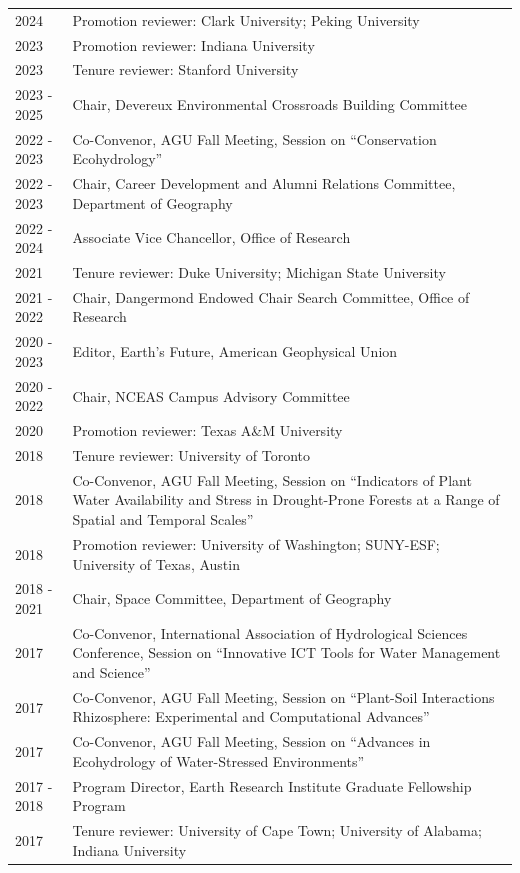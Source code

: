 \begin{longtable}{l p{5.5in}}
2024 & Promotion reviewer: Clark University; Peking University \\
2023 & Promotion reviewer: Indiana University \\
2023 & Tenure reviewer: Stanford University \\
2023 - 2025 & Chair, Devereux Environmental Crossroads Building Committee \\
2022 - 2023 & Co-Convenor, AGU Fall Meeting, Session on ``Conservation Ecohydrology'' \\
2022 - 2023 & Chair, Career Development and Alumni Relations Committee, Department of Geography \\
2022 - 2024 & Associate Vice Chancellor, Office of Research \\
2021 & Tenure reviewer: Duke University; Michigan State University \\
2021 - 2022 & Chair, Dangermond Endowed Chair Search Committee, Office of Research \\
2020 - 2023 & Editor, Earth's Future, American Geophysical Union \\
2020 - 2022 & Chair, NCEAS Campus Advisory Committee \\
2020 & Promotion reviewer: Texas A\&M University \\
2018 & Tenure reviewer: University of Toronto \\
2018 & Co-Convenor, AGU Fall Meeting, Session on ``Indicators of Plant Water Availability and Stress in Drought-Prone Forests at a Range of Spatial and Temporal Scales'' \\
2018 & Promotion reviewer: University of Washington; SUNY-ESF; University of Texas, Austin \\
2018 - 2021 & Chair, Space Committee, Department of Geography \\
2017 & Co-Convenor, International Association of Hydrological Sciences Conference, Session on ``Innovative ICT Tools for Water Management and Science'' \\
2017 & Co-Convenor, AGU Fall Meeting, Session on ``Plant-Soil Interactions Rhizosphere: Experimental and Computational Advances'' \\
2017 & Co-Convenor, AGU Fall Meeting, Session on ``Advances in Ecohydrology of Water-Stressed Environments'' \\
2017 - 2018 & Program Director, Earth Research Institute Graduate Fellowship Program \\
2017 & Tenure reviewer: University of Cape Town; University of Alabama; Indiana University \\

\end{longtable}
